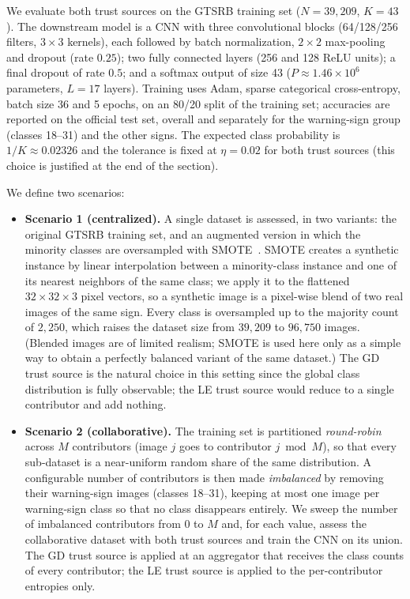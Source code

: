 We evaluate both trust sources on the \ac{GTSRB} training set ($N = 39{,}209$, $K = 43$). The downstream model is a \ac{CNN} with three convolutional blocks (64/128/256 filters, $3 \times 3$ kernels), each followed by batch normalization, $2 \times 2$ max-pooling and dropout (rate $0.25$); two fully connected layers (256 and 128 ReLU units); a final dropout of rate $0.5$; and a softmax output of size 43 ($P \approx 1.46 \times 10^{6}$ parameters, $L = 17$ layers). Training uses Adam, sparse categorical cross-entropy, batch size 36 and 5 epochs, on an 80/20 split of the training set; accuracies are reported on the official test set, overall and separately for the warning-sign group (classes 18--31) and the other signs. The expected class probability is $1/K \approx 0.02326$ and the tolerance is fixed at $\eta = 0.02$ for both trust sources (this choice is justified at the end of the section).

We define two scenarios:
\begin{itemize}
  \item \textbf{Scenario 1 (centralized).} A single dataset is assessed, in two variants: the original \ac{GTSRB} training set, and an augmented version in which the minority classes are oversampled with SMOTE~\cite{DBLP:journals/corr/abs-1106-1813}. SMOTE creates a synthetic instance by linear interpolation between a minority-class instance and one of its nearest neighbors of the same class; we apply it to the flattened $32 \times 32 \times 3$ pixel vectors, so a synthetic image is a pixel-wise blend of two real images of the same sign. Every class is oversampled up to the majority count of $2{,}250$, which raises the dataset size from $39{,}209$ to $96{,}750$ images. (Blended images are of limited realism; SMOTE is used here only as a simple way to obtain a perfectly balanced variant of the same dataset.) The GD trust source is the natural choice in this setting since the global class distribution is fully observable; the LE trust source would reduce to a single contributor and add nothing.
  \item \textbf{Scenario 2 (collaborative).} The training set is partitioned \emph{round-robin} across $M$ contributors (image $j$ goes to contributor $j \bmod M$), so that every sub-dataset is a near-uniform random share of the same distribution. A configurable number of contributors is then made \emph{imbalanced} by removing their warning-sign images (classes 18--31), keeping at most one image per warning-sign class so that no class disappears entirely. We sweep the number of imbalanced contributors from $0$ to $M$ and, for each value, assess the collaborative dataset with both trust sources and train the \ac{CNN} on its union. The GD trust source is applied at an aggregator that receives the class counts of every contributor; the LE trust source is applied to the per-contributor entropies only.
\end{itemize}


